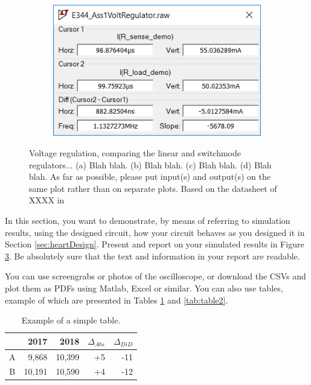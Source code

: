 {\begin{figure}
\begin{subfigure}[]{0.55\textwidth}
		    \caption{} \label{subfig:pwr_simu_rect}
     \end{subfigure}
    \begin{subfigure}[]{0.4\textwidth}
              \centering
  		\includegraphics[width=1\linewidth]{./Figures/Screengrab2}
		    \caption{} \label{subfig:pwr_simu_rect}
     \end{subfigure}
   \caption[\textcolor{red}{I am the short caption that appears in the List of Figures list}]{Voltage regulation, comparing the linear and switchmode regulators... (a)  Blah blah. (b)  Blah blah.  (c)  Blah blah. (d) Blah blah.   As far as possible, please put input(s) and output(s) on the same plot rather than on separate plots. Based on the datasheet of XXXX in \cite{WebsiteOpAmp}}
    \label{fig:simulation_results_box}
 \end{figure}

In this section, you want to demonstrate, by means of referring to simulation results, using the designed circuit, how your circuit behaves as you designed it in Section \ref{sec:heartDesign}. Present and report on your simulated results in Figure \ref{fig:simulation_results_box}. Be absolutely sure that the text and information in your report are readable. 

You can use screengrabs or photos of the oscilloscope, or download the CSVs and plot them as PDFs using Matlab, Excel or similar. 
You can also use tables, example of which are presented in Tables \ref{tab:table1} and \ref{tab:table2}.


\begin{table}
        \centering
        \footnotesize
        \caption{Example of a simple table.}
         \begin{tabular}{c@{\qquad}rrrr}
          \toprule
             & 2017 & 2018 & $\Delta_{Abs}$ & $\Delta_{DiD}$\\
          \midrule
          A & 9,868      & 10,399 & +5 & -11\\
          B & 10,191     & 10,590 & +4 & -12\\
          \bottomrule
        \end{tabular}
     \label{tab:table1}
\end{table}


}
